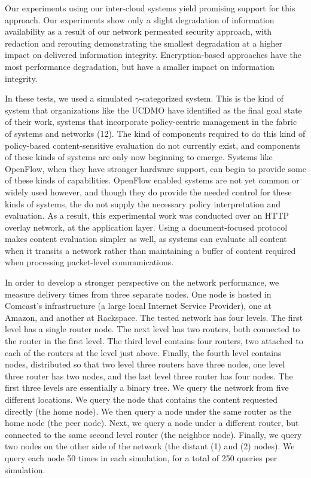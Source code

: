 Our experiments using our inter-cloud systems yield promising support for this approach.  Our experiments show only a slight degradation of information availability as a result of our network permeated security approach, with redaction and rerouting demonstrating the smallest degradation at a higher impact on delivered information integrity.  Encryption-based approaches have the most performance degradation, but have a smaller impact on information integrity.

In these tests, we used a simulated $\gamma$-categorized system.  This is the kind of system that organizations like the UCDMO have identified as the final goal state of their work, systems that incorporate policy-centric management in the fabric of systems and networks (12).  The kind of components required to do this kind of policy-based content-sensitive evaluation do not currently exist, and components of these kinds of systems are only now beginning to emerge.  Systems like OpenFlow, when they have stronger hardware support, can begin to provide some of these kinds of capabilities.  OpenFlow enabled systems are not yet common or widely used however, and though they do provide the needed control for these kinds of systems, the do not supply the necessary policy interpretation and evaluation.  As a result, this experimental work was conducted over an HTTP overlay network, at the application layer.  Using a document-focused protocol makes content evaluation simpler as well, as systems can evaluate all content when it transits a network rather than maintaining a buffer of content required when processing packet-level communications.

In order to develop a stronger perspective on the network performance, we measure delivery times from three separate nodes.   One node is hosted in Comcast's infrastructure (a large local Internet Service Provider), one at Amazon, and another at Rackspace.  The tested network has four levels.  The first level has a single router node.  The next level has two routers, both connected to the router in the first level.  The third level contains four routers, two attached to each of the routers at the level just above.  Finally, the fourth level contains nodes, distributed so that two level three routers have three nodes, one level three router has two nodes, and the last level three router has four nodes.  The first three levels are essentially a binary tree.  We query the network from five different locations.  We query the node that contains the content requested directly (the home node).  We then query a node under the same router as the home node (the peer node).  Next, we query a node under a different router, but connected to the same second level router (the neighbor node).  Finally, we query two nodes on the other side of the network (the distant (1) and (2) nodes).  We query each node 50 times in each simulation, for a total of 250 queries per simulation.

